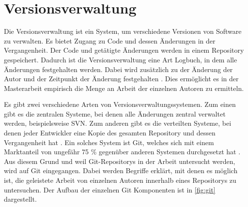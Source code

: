 \section{Versionsverwaltung}
\label{sec:versionsverwaltung}
Die Versionsverwaltung ist ein System, um verschiedene Versionen von Software zu verwalten.
Es bietet Zugang zu Code und dessen Änderungen in der Vergangenheit.
Der Code und getätigte Änderungen werden in einem Repository gespeichert.
Dadurch ist die Versionsverwaltung eine Art Logbuch, in dem alle Änderungen festgehalten werden.
Dabei wird zusätzlich zu der Änderung der Autor und der Zeitpunkt der Änderung festgehalten \autocite{ponuthorai_version_2022}.
Dies ermöglicht es in der Masterarbeit empirisch die Menge an Arbeit der einzelnen Autoren zu ermitteln.

Es gibt zwei verschiedene Arten von Versionsverwaltungssystemen.
Zum einen gibt es die zentralen Systeme, bei denen alle Änderungen zentral verwaltet werden, beispielsweise SVN.
Zum anderen gibt es die verteilten Systeme, bei denen jeder Entwickler eine Kopie des gesamten Repository und dessen Vergangenheit hat \autocite{ponuthorai_version_2022}.
Ein solches System ist Git, welches sich mit einem Marktanteil von ungefähr 75 \% gegenüber anderen Systemen durchgesetzt hat \autocite{lindner_version_2024}.
Aus diesem Grund und weil Git-Repositorys in der Arbeit untersucht werden, wird auf Git eingegangen.
Dabei werden Begriffe erklärt, mit denen es möglich ist, die geleistete Arbeit von einzelnen Autoren innerhalb eines Repositorys zu untersuchen.
Der Aufbau der einzelnen Git Komponenten ist in \autoref{fig:git} dargestellt.

